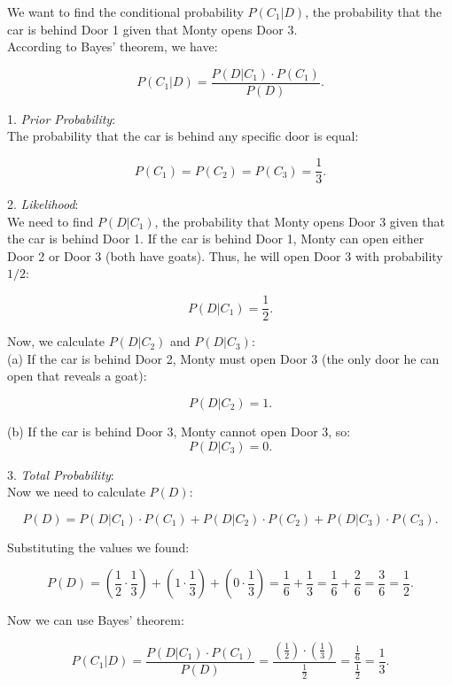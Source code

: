 We want to find the conditional probability \(P(C_1 | D)\), the probability that the car is behind Door 1 given that Monty opens Door 3.\\

According to Bayes' theorem, we have:

\[
P(C_1 | D) = \frac{P(D | C_1) \cdot P(C_1)}{P(D)}.
\]


1. \textit{Prior Probability}:\\

   The probability that the car is behind any specific door is equal:

   \[
   P(C_1) = P(C_2) = P(C_3) = \frac{1}{3}.
   \]

2. \textit{Likelihood}:\\

   We need to find \(P(D | C_1)\), the probability that Monty opens Door 3 given that the car is behind Door 1. If the car is behind Door 1, Monty can open either Door 2 or Door 3 (both have goats). Thus, he will open Door 3 with probability \(1/2\):

   \[
   P(D | C_1) = \frac{1}{2}.
   \]

   Now, we calculate \(P(D | C_2)\) and \(P(D | C_3)\):\\

   (a) If the car is behind Door 2, Monty must open Door 3 (the only door he can open that reveals a goat):

   \[
   P(D | C_2) = 1.
   \]

   (b) If the car is behind Door 3, Monty cannot open Door 3, so:\\

   \[
   P(D | C_3) = 0.
   \]

3. \textit{Total Probability}:\\

   Now we need to calculate \(P(D)\):

   \[
   P(D) = P(D | C_1) \cdot P(C_1) + P(D | C_2) \cdot P(C_2) + P(D | C_3) \cdot P(C_3).
   \]

   Substituting the values we found:

   \[
   P(D) = \left(\frac{1}{2} \cdot \frac{1}{3}\right) + (1 \cdot \frac{1}{3}) + (0 \cdot \frac{1}{3}) = \frac{1}{6} + \frac{1}{3} = \frac{1}{6} + \frac{2}{6} = \frac{3}{6} = \frac{1}{2}.
   \]

Now we can use Bayes' theorem:

\[
P(C_1 | D) = \frac{P(D | C_1) \cdot P(C_1)}{P(D)} = \frac{\left(\frac{1}{2}\right) \cdot \left(\frac{1}{3}\right)}{\frac{1}{2}} = \frac{\frac{1}{6}}{\frac{1}{2}} = \frac{1}{3}.
\]

